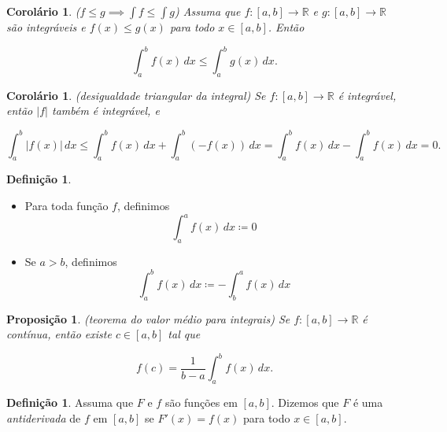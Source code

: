 \documentclass[12pt]{article}
\theoremstyle{plain}
\newtheorem{prop}[thm]{Proposição}
\newtheorem{cor}[thm]{Corolário}
\theoremstyle{definition}
\newtheorem{defn}[thm]{Definição}
\theoremstyle{remark}
\begin{document}
\begin{cor} (\(f\leq g \implies \int f \leq \int g\))
    Assuma que \(f: [a,b] \to \mathbb{R}\) e \(g: [a,b] \to \mathbb{R}\) são integráveis e \(f(x) \leq g(x)\) para todo \(x \in [a,b]\). Então

    \begin{equation}
        \int_a^b f(x) \, dx \leq \int_a^b g(x) \, dx.
    \end{equation}
\end{cor}

\begin{cor} (desigualdade triangular da integral)
    Se \(f: [a,b] \to \mathbb{R}\) é integrável, então \(\vert f \vert\) também é integrável, e

    \begin{equation}
        \int_a^b \vert f(x) \vert \, dx \leq \int_a^b f(x) \, dx + \int_a^b (-f(x)) \, dx = \int_a^b f(x) \, dx - \int_a^b f(x) \, dx = 0.
    \end{equation}
\end{cor}

\begin{defn}
    \begin{itemize}
        \item Para toda função \(f\), definimos \[\int_{a}^{a}f(x) \, dx \coloneq 0\]
        \item Se \(a > b\), definimos \[\int_{a}^{b}f(x) \, dx \coloneq -\int_{b}^{a}f(x) \, dx\]
    \end{itemize}
\end{defn}

\begin{prop} (teorema do valor médio para integrais)
    Se \(f : [a,b] \to \mathbb{R}\) é contínua, então existe \(c \in [a,b]\) tal que

    \begin{equation}
        f(c) = \frac{1}{b-a} \int_a^b f(x) \, dx.
    \end{equation}
\end{prop}

\begin{defn}
    Assuma que \(F\) e \(f\) são funções em \([a,b]\). Dizemos que \(F\) é uma \emph{antiderivada} de \(f\) em \([a,b]\) se \(F'(x) = f(x)\) para todo \(x \in [a,b]\).
\end{defn}
\end{document}
